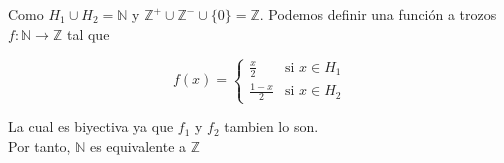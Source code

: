 \documentclass[letterpaper, 12pt]{article} %
\begin{document}
\begin{Proof}
Como $H_{1} \cup H_{2} = \mathbb{N}$ y $\mathbb{Z}^{+} \cup \mathbb{Z}^{-} \cup \{0\} = \mathbb{Z}$.
Podemos definir una función a trozos $f : \mathbb{N} \longrightarrow \mathbb{Z}$ tal que

\[
f(x) =
\begin{cases}
\frac{x}{2} & \text{si }  x \in H_{1} \\
\frac{1-x}{2} & \text{si } x \in H_{2}
\end{cases}
\]

La cual es biyectiva ya que $f_{1}$ y $f_{2}$ tambien lo son.\\

Por tanto, $\mathbb{N}$ es equivalente a $\mathbb{Z}$
\end{Proof}
\end{document}
